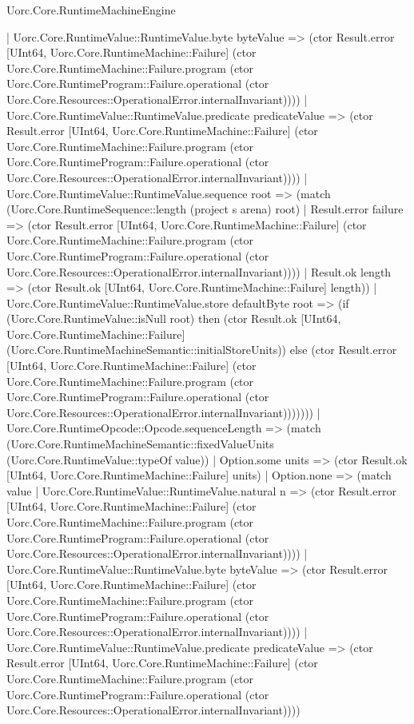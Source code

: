 \begin{lexlean}{Uorc.Core.RuntimeMachineEngine}
\begin{semanticmodule}
{              | Uorc.Core.RuntimeValue::RuntimeValue.byte byteValue => (ctor Result.error [UInt64, Uorc.Core.RuntimeMachine::Failure] (ctor Uorc.Core.RuntimeMachine::Failure.program (ctor Uorc.Core.RuntimeProgram::Failure.operational (ctor Uorc.Core.Resources::OperationalError.internalInvariant))))
              | Uorc.Core.RuntimeValue::RuntimeValue.predicate predicateValue => (ctor Result.error [UInt64, Uorc.Core.RuntimeMachine::Failure] (ctor Uorc.Core.RuntimeMachine::Failure.program (ctor Uorc.Core.RuntimeProgram::Failure.operational (ctor Uorc.Core.Resources::OperationalError.internalInvariant))))
              | Uorc.Core.RuntimeValue::RuntimeValue.sequence root => (match (Uorc.Core.RuntimeSequence::length (project s arena) root)
                | Result.error failure => (ctor Result.error [UInt64, Uorc.Core.RuntimeMachine::Failure] (ctor Uorc.Core.RuntimeMachine::Failure.program (ctor Uorc.Core.RuntimeProgram::Failure.operational (ctor Uorc.Core.Resources::OperationalError.internalInvariant))))
                | Result.ok length => (ctor Result.ok [UInt64, Uorc.Core.RuntimeMachine::Failure] length))
              | Uorc.Core.RuntimeValue::RuntimeValue.store defaultByte root => (if (Uorc.Core.RuntimeValue::isNull root) then (ctor Result.ok [UInt64, Uorc.Core.RuntimeMachine::Failure] (Uorc.Core.RuntimeMachineSemantic::initialStoreUnits)) else (ctor Result.error [UInt64, Uorc.Core.RuntimeMachine::Failure] (ctor Uorc.Core.RuntimeMachine::Failure.program (ctor Uorc.Core.RuntimeProgram::Failure.operational (ctor Uorc.Core.Resources::OperationalError.internalInvariant)))))))
          | Uorc.Core.RuntimeOpcode::Opcode.sequenceLength => (match (Uorc.Core.RuntimeMachineSemantic::fixedValueUnits (Uorc.Core.RuntimeValue::typeOf value))
            | Option.some units => (ctor Result.ok [UInt64, Uorc.Core.RuntimeMachine::Failure] units)
            | Option.none => (match value
              | Uorc.Core.RuntimeValue::RuntimeValue.natural n => (ctor Result.error [UInt64, Uorc.Core.RuntimeMachine::Failure] (ctor Uorc.Core.RuntimeMachine::Failure.program (ctor Uorc.Core.RuntimeProgram::Failure.operational (ctor Uorc.Core.Resources::OperationalError.internalInvariant))))
              | Uorc.Core.RuntimeValue::RuntimeValue.byte byteValue => (ctor Result.error [UInt64, Uorc.Core.RuntimeMachine::Failure] (ctor Uorc.Core.RuntimeMachine::Failure.program (ctor Uorc.Core.RuntimeProgram::Failure.operational (ctor Uorc.Core.Resources::OperationalError.internalInvariant))))
              | Uorc.Core.RuntimeValue::RuntimeValue.predicate predicateValue => (ctor Result.error [UInt64, Uorc.Core.RuntimeMachine::Failure] (ctor Uorc.Core.RuntimeMachine::Failure.program (ctor Uorc.Core.RuntimeProgram::Failure.operational (ctor Uorc.Core.Resources::OperationalError.internalInvariant))))
}
\end{semanticmodule}
\end{lexlean}
